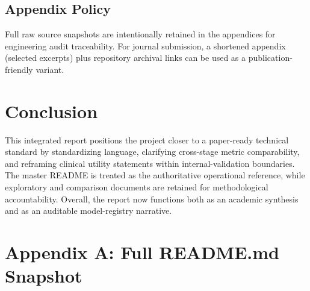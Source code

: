 ﻿\documentclass[11pt,a4paper]{article}
\begin{document}
\subsection{Appendix Policy}

Full raw source snapshots are intentionally retained in the appendices for engineering
audit traceability. For journal submission, a shortened appendix (selected excerpts) plus
repository archival links can be used as a publication-friendly variant.

\section{Conclusion}

This integrated report positions the project closer to a paper-ready technical standard by
standardizing language, clarifying cross-stage metric comparability, and reframing clinical
utility statements within internal-validation boundaries. The master README is treated as
the authoritative operational reference, while exploratory and comparison documents are
retained for methodological accountability. Overall, the report now functions both as an
academic synthesis and as an auditable model-registry narrative.

\newpage
\appendix

\section{Appendix A: Full README.md Snapshot}
\end{document}
